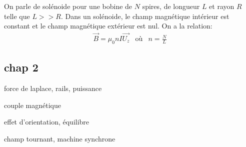 \begin{proposition}
    On parle de solénoide pour une bobine de $N$ spires, de longueur $L$ et rayon $R$ telle que $L >> R$.
    Dans un solénoide, le champ magnétique intérieur est constant et le champ magnétique extérieur est nul.
    On a la relation:
    \[\begin{array}{lcr}
         \vec{B} = \mu_{0}n I \vec{U_{z}} & \text{où} & n = \frac{N}{L}
    \end{array} \]
\end{proposition}

\subsection{chap 2}

force de laplace, rails, puissance

couple magnétique

effet d'orientation, équilibre

champ tournant, machine synchrone